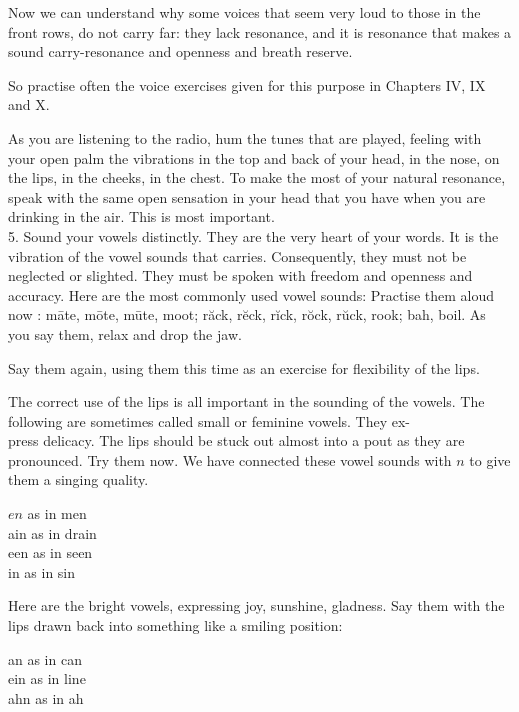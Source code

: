 \documentclass[10pt]{article}
\begin{document}
Now we can understand why some voices that seem very loud to those in the front rows, do not carry far: they lack resonance, and it is resonance that makes a sound carry-resonance and openness and breath reserve.

So practise often the voice exercises given for this purpose in Chapters IV, IX and X.

As you are listening to the radio, hum the tunes that are played, feeling with your open palm the vibrations in the top and back of your head, in the nose, on the lips, in the cheeks, in the chest. To make the most of your natural resonance, speak with the same open sensation in your head that you have when you are drinking in the air. This is most important.\\
5. Sound your vowels distinctly. They are the very heart of your words. It is the vibration of the vowel sounds that carries. Consequently, they must not be neglected or slighted. They must be spoken with freedom and openness and accuracy. Here are the most commonly used vowel sounds: Practise them aloud now : māte, mōte, mūte, moot; răck, rĕck, rĭck, rŏck, rŭck, rook; bah, boil. As you say them, relax and drop the jaw.

Say them again, using them this time as an exercise for flexibility of the lips.

The correct use of the lips is all important in the sounding of the vowels. The following are sometimes called small or feminine vowels. They ex-\\
press delicacy. The lips should be stuck out almost into a pout as they are pronounced. Try them now. We have connected these vowel sounds with $n$ to give them a singing quality.

\begin{displayquote}
$e n$ as in men\\
ain as in drain\\
een as in seen\\
in as in sin
\end{displayquote}

Here are the bright vowels, expressing joy, sunshine, gladness. Say them with the lips drawn back into something like a smiling position:

\begin{displayquote}
an as in can\\
ein as in line\\
ahn as in ah
\end{displayquote}
\end{document}
